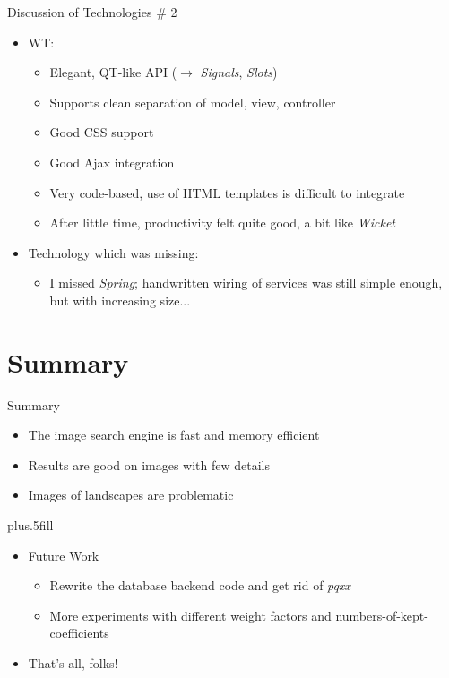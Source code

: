 \documentclass{beamer}
\newcommand\rarrow{$\longrightarrow$ } %
\begin{document}
\begin{frame}{Discussion of Technologies \# 2}

  \begin{itemize}
  \item WT:
    \begin{itemize}
    \item Elegant, QT-like API (\rarrow \emph{Signals}, \emph{Slots})
    \item Supports clean separation of model, view, controller
    \item Good CSS support
    \item Good Ajax integration
    \item Very code-based, use of HTML templates is difficult to
      integrate
    \item After little time, productivity felt quite good, a bit like
      \emph{Wicket}
    \end{itemize}
    \pause
  \item Technology which was missing:
    \begin{itemize}
    \item I missed \emph{Spring}; handwritten wiring of services was
      still simple enough, but with increasing size...
    \end{itemize}
  \end{itemize}
  
\end{frame}

\section*{Summary}

\begin{frame}{Summary}

  \begin{itemize}
  \item The image search engine is fast and memory efficient
  \item Results are good on images with few details
  \item Images of landscapes are problematic
  \end{itemize}
  
  \pause
  \vskip0pt plus.5fill
  \begin{itemize}
  \item Future Work
    \begin{itemize}
    \item Rewrite the database backend code and get rid of \emph{pqxx}
    \item More experiments with different weight factors and
      numbers-of-kept-coefficients
    \end{itemize}
    \pause
  \item That's all, folks!
  \end{itemize}
\end{frame}
\end{document}
